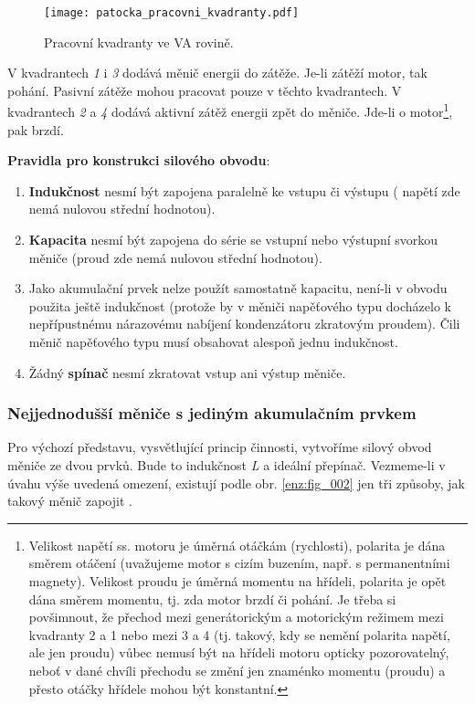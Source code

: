      \begin{wrapfigure}[12]{r}{4cm}
        \centering
        \texttt{[image: patocka\_pracovni\_kvadranty.pdf]}
        \caption{Pracovní kvadranty ve VA rovině.}
        \label{enz:fig_006}
      \end{wrapfigure} 
      V kvadrantech \emph{1} i \emph{3} dodává měnič energii do zátěže. Je-li zátěží motor, tak
      pohání. Pasivní zátěže mohou pracovat pouze v těchto kvadrantech. V kvadrantech \emph{2} a
      \emph{4} dodává aktivní zátěž energii zpět do měniče. Jde-li o motor\footnote{Velikost
      napětí ss. motoru je úměrná otáčkám (rychlosti), polarita je dána směrem otáčení
      (uvažujeme motor s cizím buzením, např. s permanentními magnety). Velikost proudu je
      úměrná momentu na hřídeli, polarita je opět dána směrem momentu, tj. zda motor brzdí či
      pohání. Je třeba si povšimnout, že přechod mezi generátorickým a motorickým režimem mezi
      kvadranty 2 a 1 nebo mezi 3 a 4 (tj. takový, kdy se nemění polarita napětí, ale jen
      proudu) vůbec nemusí být na hřídeli motoru opticky pozorovatelný, neboť v dané chvíli
      přechodu se změní jen znaménko momentu (proudu) a přesto otáčky hřídele mohou být
      konstantní.}, pak brzdí.
      
      \textbf{Pravidla pro konstrukci silového obvodu}:
      \begin{enumerate}\addtolength{\itemsep}{-0.5\baselineskip}
        \item \textbf{Indukčnost} nesmí být zapojena paralelně ke vstupu či výstupu ( napětí zde 
              nemá nulovou střední hodnotou).
        \item \textbf{Kapacita} nesmí být zapojena do série se vstupní nebo výstupní svorkou 
              měniče (proud zde nemá nulovou střední hodnotou).
        \item Jako akumulační prvek nelze použít samostatně kapacitu, není-li v obvodu použita
              ještě indukčnost (protože by v měniči napěťového typu docházelo k nepřípustnému
              nárazovému nabíjení kondenzátoru zkratovým proudem). Čili měnič napěťového typu
              musí obsahovat alespoň jednu indukčnost.
        \item Žádný \textbf{spínač} nesmí zkratovat vstup ani výstup měniče.
      \end{enumerate}
      
      \subsubsection{Nejjednodušší měniče s jediným akumulačním 
        prvkem}\label{ENZ:tit_menice_s_1_aku_prvkem} 
        Pro výchozí představu, vysvětlující princip činnosti, vytvoříme silový obvod měniče ze
        dvou prvků. Bude to indukčnost  \emph{L} a ideální přepínač. Vezmeme-li v úvahu výše 
        uvedená omezení, existují podle obr. \ref{enz:fig_002} jen tři způsoby, jak takový měnič 
        zapojit \cite{Patocka}.
      
